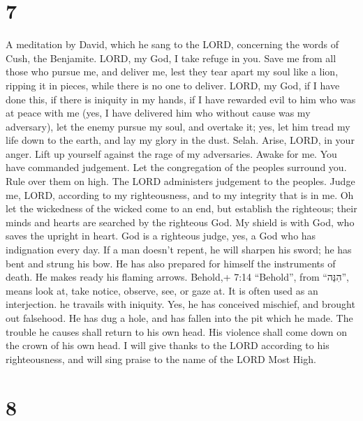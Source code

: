 \hypertarget{section-6}{%
\section{7}\label{section-6}}

A meditation by David, which he sang to the LORD, concerning the words
of Cush, the Benjamite.  LORD, my God, I take refuge in you.
Save me from all those who pursue me, and deliver me,  lest
they tear apart my soul like a lion, ripping it in pieces, while there
is no one to deliver.  LORD, my God, if I have done this, if
there is iniquity in my hands,  if I have rewarded evil to
him who was at peace with me (yes, I have delivered him who without
cause was my adversary),  let the enemy pursue my soul, and
overtake it; yes, let him tread my life down to the earth, and lay my
glory in the dust. Selah.  Arise, LORD, in your anger. Lift
up yourself against the rage of my adversaries. Awake for me. You have
commanded judgement.  Let the congregation of the peoples
surround you. Rule over them on high.  The LORD administers
judgement to the peoples. Judge me, LORD, according to my righteousness,
and to my integrity that is in me.  Oh let the wickedness of
the wicked come to an end, but establish the righteous; their minds and
hearts are searched by the righteous God.  My shield is
with God, who saves the upright in heart.  God is a
righteous judge, yes, a God who has indignation every day. 
If a man doesn't repent, he will sharpen his sword; he has bent and
strung his bow.  He has also prepared for himself the
instruments of death. He makes ready his flaming arrows. 
Behold,+ 7:14 ``Behold'', from ``הִנֵּה'', means look at, take notice,
observe, see, or gaze at. It is often used as an interjection. he
travails with iniquity. Yes, he has conceived mischief, and brought out
falsehood.  He has dug a hole, and has fallen into the pit
which he made.  The trouble he causes shall return to his
own head. His violence shall come down on the crown of his own head.
 I will give thanks to the LORD according to his
righteousness, and will sing praise to the name of the LORD Most High.

\hypertarget{section-7}{%
\section{8}\label{section-7}}

